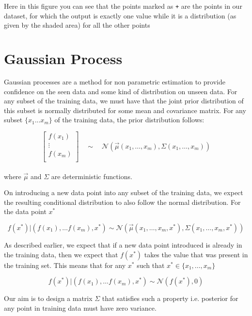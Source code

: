 \documentclass[12pt]{article}
\begin{document}
Here in this figure you can see that the points marked as \texttt{+} are the points in our dataset, for which the output is exactly one value while it is a distribution (as given by the shaded area) for all the other points

\section{Gaussian Process}

Gaussian processes are a method for non parametric estimation to provide confidence on the seen data and some kind of distribution on unseen data. For any subset of the training data, we must have that the joint prior distribution of this subset is normally distributed for some mean and covariance matrix. For any subset $\{x_1 ... x_m\}$ of the training data, the prior distribution follows:

\[
\begin{bmatrix}
    f(x_1) \\
    \vdots \\
    f(x_m) \\
\end{bmatrix}
\quad \sim \quad
\mathcal{N} (\vec{\mu} (x_1,\dots ,x_m),\Sigma (x_1,\dots,x_m) )
\]
\\
where $\vec{\mu}$ and $\Sigma$ are deterministic functions.


On introducing a new data point into any subset of the training data, we expect the resulting conditional distribution to also follow the normal distribution. For the data point $x^*$

\[
f(x^*) \vert (f(x_1), \dots f(x_m), x^*) \sim \mathcal{N}(\vec{\mu}(x_1,\dots,x_m,x^*), \Sigma(x_1,\dots,x_m,x^*))
\]



As described earlier, we expect that if a new data point introduced is already in the training data, then we expect that $f(x^*)$ takes the value that was present in the training set. This means that for any $x^*$ such that $x^* \in \{x_1,\dots,x_m\} $


\[
f(x^*) \vert (f(x_1), \dots f(x_m), x^*) \sim \mathcal{N}(f(x^*), 0)
\]

Our aim is to design a matrix $\Sigma$ that satisfies such a property i.e. posterior for any point in training data must have zero variance.
\end{document}

